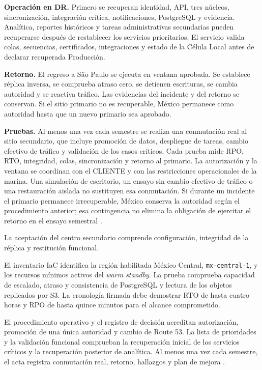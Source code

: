 \textbf{Operación en DR.} Primero se recuperan identidad, API, tres núcleos, sincronización, integración crítica, notificaciones, PostgreSQL y evidencia. Analítica, reportes históricos y tareas administrativas secundarias pueden recuperarse después de restablecer los servicios prioritarios. El servicio valida colas, secuencias, certificados, integraciones y estado de la Célula Local antes de declarar recuperada Producción.

\textbf{Retorno.} El regreso a São Paulo se ejecuta en ventana aprobada. Se establece réplica inversa, se comprueba atraso cero, se detienen escrituras, se cambia autoridad y se reactiva tráfico. Las evidencias del incidente y del retorno se conservan. Si el sitio primario no es recuperable, México permanece como autoridad hasta que un nuevo primario sea aprobado.

\textbf{Pruebas.} Al menos una vez cada semestre se realiza una conmutación real al sitio secundario, que incluye promoción de datos, despliegue de tareas, cambio efectivo de tráfico y validación de los casos críticos. Cada prueba mide RPO, RTO, integridad, colas, sincronización y retorno al primario. La autorización y la ventana se coordinan con el CLIENTE y con las restricciones operacionales de la marina. Una simulación de escritorio, un ensayo sin cambio efectivo de tráfico o una restauración aislada no sustituyen esa conmutación. Si durante un incidente el primario permanece irrecuperable, México conserva la autoridad según el procedimiento anterior; esa contingencia no elimina la obligación de ejercitar el retorno en el ensayo semestral \parencites[art.~20, pp.~14--15]{pucv-admin}[RT-07.07, p.~17]{pucv-transversal}.

La aceptación del centro secundario comprende configuración, integridad de la réplica y restitución funcional.

El inventario IaC identifica la región habilitada México Central, \texttt{mx-central-1}, y los recursos mínimos activos del \emph{warm standby}. La prueba comprueba capacidad de escalado, atraso y consistencia de PostgreSQL y lectura de los objetos replicados por S3. La cronología firmada debe demostrar RTO de hasta cuatro horas y RPO de hasta quince minutos para el alcance comprometido.

El procedimiento operativo y el registro de decisión acreditan autorización, promoción de una única autoridad y cambio de Route 53. La lista de prioridades y la validación funcional comprueban la recuperación inicial de los servicios críticos y la recuperación posterior de analítica. Al menos una vez cada semestre, el acta registra conmutación real, retorno, hallazgos y plan de mejora \parencites[art.~20, pp.~14--15]{pucv-admin}[cap.~7, pp.~17--18; cap.~10, p.~22]{pucv-transversal}{aws-rds-crossregion,aws-reliability}.

